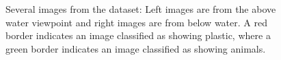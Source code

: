 \begin{figure}
{\begin{tabular}{rl}
\end{tabular}}
\fi
\caption{Several images from the dataset: Left images are from the above water viewpoint and right images are from below water. A red border indicates an image classified as showing plastic, where a green border indicates an image classified as showing animals.}
\label{fig:datasetimages}
\end{figure}